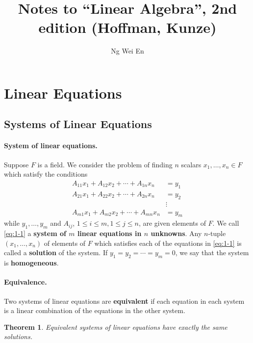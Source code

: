 \documentclass{article}
\title{Notes to ``Linear Algebra'', 2nd edition (Hoffman, Kunze)}
\author{Ng Wei En}
\newtheorem{theorem}{Theorem}
\begin{document}
\maketitle
\tableofcontents
\newpage

\section{Linear Equations}

\setcounter{subsection}{1}
\subsection{Systems of Linear Equations}

\paragraph{System of linear equations.} Suppose $F$ is a field. We consider the
problem of finding $n$ scalars $x_1, \ldots, x_n \in F$ which satisfy the
conditions
\begin{equation}\label{eq:1-1}\tag{1-1}
  \begin{aligned}
    A_{11}x_1 + A_{12}x_2 + \cdots + A_{1n}x_n &= y_1 \\
    A_{21}x_1 + A_{22}x_2 + \cdots + A_{2n}x_n &= y_2 \\
    &\vdots \\
    A_{m1}x_1 + A_{m2}x_2 + \cdots + A_{mn}x_n &= y_m
  \end{aligned}
\end{equation}
while $y_1, \ldots, y_m$ and $A_{ij}$, $1 \leq i \leq m, 1 \leq j \leq n$, are
given elements of $F$. We call \eqref{eq:1-1} a \textbf{system of $m$ linear
equations in $n$ unknowns}. Any $n$-tuple $(x_1, \ldots, x_n)$ of elements of
$F$ which satisfies each of the equations in \eqref{eq:1-1} is called a
\textbf{solution} of the system. If $y_1 = y_2 = \cdots = y_m = 0$, we say that
the system is \textbf{homogeneous}.

\paragraph{Equivalence.} Two systems of linear equations are \textbf{equivalent}
if each equation in each system is a linear combination of the equations in the
other system.

\begin{theorem}
  Equivalent systems of linear equations have exactly the same solutions.
\end{theorem}
\end{document}
